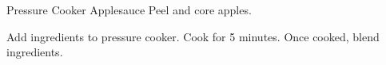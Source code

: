 \documentclass[../main.tex]{subfiles}
\begin{document}
\begin{recipe}{Pressure Cooker Applesauce}{}{}
    Peel and core apples.

    Add ingredients to pressure cooker. Cook for 5 minutes.
    Once cooked, blend ingredients.

\end{recipe}
\end{document}
